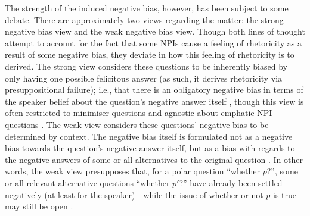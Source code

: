 The strength of the induced negative bias, however, has been subject to some debate. There are approximately two views regarding the matter: the strong negative bias view and the weak negative bias view. Though both lines of thought attempt to account for the fact that some NPIs cause a feeling of rhetoricity as a result of some negative bias, they deviate in how this feeling of rhetoricity is to derived. The strong view considers these questions to be inherently biased by only having one possible felicitous answer (as such, it derives rhetoricity via presuppositional failure); i.e., that there is an obligatory negative bias in terms of the speaker belief about the question's negative answer itself \parencite{Guerzoni2004,Asher2005}, though this view is often restricted to minimiser questions and agnostic about emphatic NPI questions \parencite[e.g.][]{Guerzoni2004}. The weak view considers these questions' negative bias to be determined by context. The negative bias itself is formulated not as a negative bias towards the question's negative answer itself, but as a bias with regards to the negative answers of some or all alternatives to the original question \parencite{Borkin1971,vanRooij2003,Jeong2020,Jeong2021,Jeong2022}. In other words, the weak view presupposes that, for a polar question \enquote{whether $p$?}, some or all relevant alternative questions \enquote{whether $p'$?} have already been settled negatively (at least for the speaker)---while the issue of whether or not $p$ is true may still be open \parencite{Borkin1971,vanRooij2003,Jeong2020,Jeong2021,Jeong2022}.

